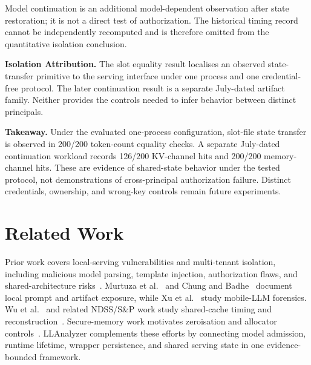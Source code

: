 \documentclass[journal,tifs]{IEEEtran}
\begin{document}
Model continuation is an additional model-dependent observation after
state restoration; it is not a direct test of authorization. The historical
timing record cannot be independently recomputed and is therefore omitted
from the quantitative isolation conclusion.


{\bf Isolation Attribution.}
The slot equality result localises an observed state-transfer primitive to
the serving interface under one process and one credential-free protocol.
The later continuation result is a separate July-dated artifact family.
Neither provides the controls needed to infer behavior between distinct
principals.


{\bf Takeaway.}
Under the evaluated one-process configuration, slot-file state transfer is
observed in 200/200 token-count equality checks. A separate July-dated
continuation workload records 126/200 KV-channel hits and 200/200
memory-channel hits. These are evidence of shared-state behavior under the
tested protocol, not demonstrations of cross-principal authorization
failure. Distinct credentials, ownership, and wrong-key controls remain
future experiments.

\vspace{-0.2cm}
\section{Related Work}
\label{sec:related}
\vspace{-0.2cm}
Prior work covers local-serving vulnerabilities and multi-tenant isolation,
including malicious model parsing, template injection, authorization flaws,
and shared-architecture risks~\cite{cve_vocab_overflow,cve_bleedingllama,
cve_jinja2_ssti,cve_vllm_62164,cve_databricks,
cve_int_overflow_bypass,cve_ggml_nbytes,cve_2024_37032,cve_ollama_updater,
multitenant_llm2026,llmserving_survey2024}. Murtuza et al.~\cite{murtuza2026}
and Chung and Badhe~\cite{localnotprivate2026} document local prompt and
artifact exposure, while Xu et al.~\cite{xu2026mobilellmforensics} study
mobile-LLM forensics. Wu et al.~\cite{wu2025iknowwhatyouasked} and related
NDSS/S\&P work study shared-cache timing and reconstruction~\cite{safekv2025,
prefixwall2026,shadowcache2026,optileak2026}. Secure-memory work motivates
zeroisation and allocator controls~\cite{explicit_bzero,securestring2025,
zeroonfree2024,procfs_forensics,glibc_arena}. LLAnalyzer complements these
efforts by connecting model admission, runtime lifetime, wrapper persistence,
and shared serving state in one evidence-bounded framework.
\vspace{-0.15cm}
\end{document}
